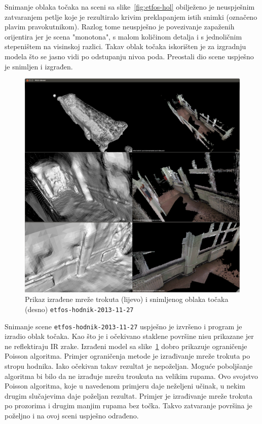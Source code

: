 Snimanje oblaka točaka na sceni sa slike~\ref{fig:etfos-hol} obilježeno
je neuspješnim zatvaranjem petlje koje je rezultiralo krivim
preklapanjem istih snimki (označeno plavim pravokutnikom). Razlog tome
neuspješno je povezivanje zapaženih orijentira jer je scena "monotona",
s malom količinom detalja i s jednoličnim stepeništem na visinskoj
razlici. Takav oblak točaka iskorišten je za izgradnju modela što se
jasno vidi po odstupanju nivoa poda.  Preostali dio scene uspješno je
snimljen i izgrađen.

\newpage
\begin{figure}[h]
\centering
\includegraphics[scale=0.25]{figures/04-etfos-hodnik1-vtk-pcd-all.png}
\caption{Prikaz izrađene mreže trokuta (lijevo) i snimljenog oblaka točaka
(desno) \texttt{etfos-hodnik-2013-11-27}} 
\label{fig:etfos-hodnik}
\end{figure}

Snimanje scene \texttt{etfos-hodnik-2013-11-27} uspješno je izvršeno i
program je izradio oblak točaka. Kao što je i očekivano staklene
površine nisu prikazane jer ne reflektiraju IR zrake. Izrađeni model sa
slike~\ref{fig:etfos-hodnik} dobro prikazuje ograničenje Poisson
algoritma. Primjer ograničenja metode je izrađivanje mreže trokuta po
stropu hodnika. Iako očekivan takav rezultat je nepoželjan. Moguće
poboljšanje algoritma bi bilo da ne izrađuje mrežu troukuta na velikim
rupama. Ovo svojstvo Poisson algoritma, koje u navedenom primjeru daje
neželjeni učinak, u nekim drugim slučajevima daje poželjan rezultat.
Primjer je izrađivanje mreže trokuta po prozorima i drugim manjim rupama
bez točka. Takvo zatvaranje površina je poželjno i na ovoj sceni
uspješno odrađeno.

